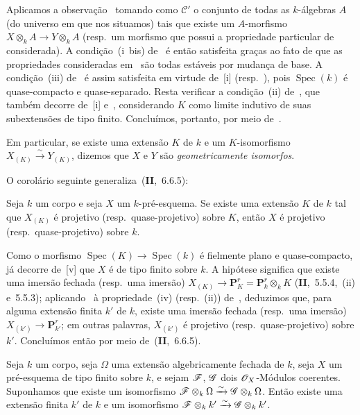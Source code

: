 Aplicamos a observação~ tomando como $\mathcal{C}'$ o conjunto de todas as $k$-álgebras $A$ (do universo em que nos situamos) tais que existe um $A$-morfismo $X\otimes_k A\to Y\otimes_k A$ (resp.\ um morfismo que possui a propriedade particular de~ considerada).
A condição~(i~bis) de~ é então satisfeita graças ao fato de que as
propriedades consideradas em~ são todas estáveis por mudança de base.
A condição~(iii) de~ é assim satisfeita em virtude de~[i] (resp.\ ), pois $\operatorname{Spec}(k)$ é quase-compacto e quase-separado.
Resta verificar a condição~(ii) de~, que também decorre de~[i] e~, considerando $K$ como limite indutivo de suas subextensões de tipo finito.
Concluímos, portanto, por meio de~.

Em particular, se existe uma extensão $K$ de $k$ e um $K$-isomorfismo $X_{(K)}\xrightarrow{\sim} Y_{(K)}$, dizemos que $X$ e $Y$ são \emph{geometricamente isomorfos}.

O corolário seguinte generaliza~(\textbf{II},~6.6.5):

\begin{corollary}[9.1.5]
\label{IV.9.1.5}
Seja $k$ um corpo e seja $X$ um $k$-pré-esquema.
Se existe uma extensão $K$ de $k$ tal que $X_{(K)}$ é projetivo \textnormal{(}resp.\ quase-projetivo\textnormal{)} sobre $K$, então $X$ é projetivo \textnormal{(}resp.\ quase-projetivo\textnormal{)} sobre $k$.
\end{corollary}

Como o morfismo $\operatorname{Spec}(K)\to\operatorname{Spec}(k)$ é fielmente plano e quase-compacto, já decorre de~[v] que $X$ é de tipo finito sobre $k$.
A hipótese significa que existe uma imersão fechada (resp.\ uma imersão) $X_{(K)}\to\mathbf{P}_K^r=\mathbf{P}_k^r\otimes_k K$ (\textbf{II},~5.5.4,~(ii) e~5.5.3); aplicando~ à propriedade~(iv) (resp.~(ii)) de~, deduzimos que, para alguma extensão finita $k'$ de $k$, existe uma imersão fechada (resp.\ uma imersão) $X_{(k')}\to\mathbf{P}_{k'}^r$; em outras palavras, $X_{(k')}$ é projetivo (resp.\ quase-projetivo) sobre $k'$.
Concluímos então por meio de~(\textbf{II},~6.6.5).

\begin{proposition}[9.1.6]
\label{IV.9.1.6}
Seja $k$ um corpo, seja $\Omega$ uma extensão algebricamente fechada de $k$, seja $X$ um pré-esquema de tipo finito sobre $k$, e sejam $\mathscr{F}$, $\mathscr{G}$ dois $\mathscr{O}_X$-Módulos coerentes.
Suponhamos que existe um isomorfismo $\mathscr{F}\otimes_k\Omega\xrightarrow{\sim}\mathscr{G}\otimes_k\Omega$.
Então existe uma extensão finita $k'$ de $k$ e um isomorfismo $\mathscr{F}\otimes_k k'\xrightarrow{\sim}\mathscr{G}\otimes_k k'$.
\end{proposition}

